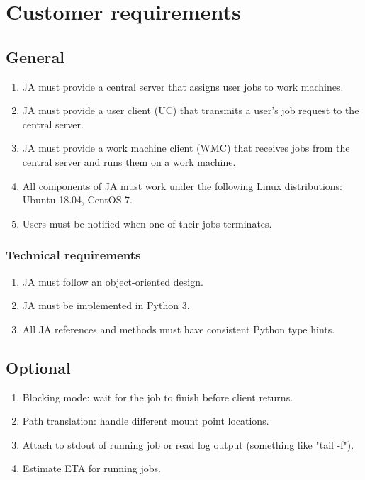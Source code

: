 \chapter{Customer requirements}
\section{General}
\begin{enumerate}
 \item JA must provide a central server that assigns user jobs to work machines.
 \item JA must provide a user client (UC) that transmits a user's job request to the central server.
 \item JA must provide a work machine client (WMC) that receives jobs from the central server and runs them on a work machine.
 \item All components of JA must work under the following Linux distributions: Ubuntu 18.04, CentOS 7.
 \item Users must be notified when one of their jobs terminates.
\end{enumerate}
\subsection{Technical requirements}
\begin{enumerate}
 \item JA must follow an object-oriented design.
 \item JA must be implemented in Python 3.
 \item All JA references and methods must have consistent Python type hints.
\end{enumerate}
\section{Optional}
\begin{enumerate}
 \item Blocking mode: wait for the job to finish before client returns.
 \item Path translation: handle different mount point locations.
 \item Attach to stdout of running job or read log output (something like "tail -f").
 \item Estimate ETA for running jobs.
\end{enumerate}
